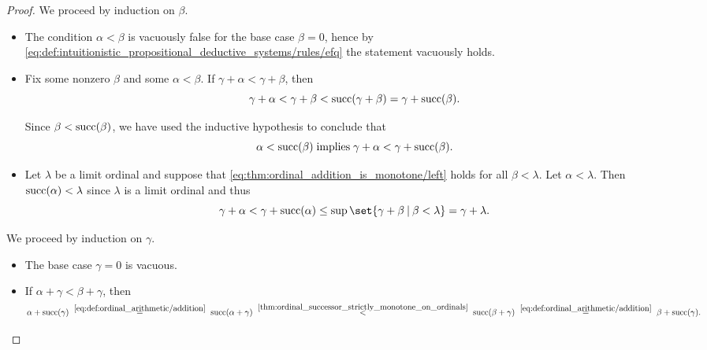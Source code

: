 \begin{proof}
   We proceed by induction on \( \beta \).
  \begin{itemize}
    \item The condition \( \alpha < \beta \) is vacuously false for the base case \( \beta = 0 \), hence by \eqref{eq:def:intuitionistic_propositional_deductive_systems/rules/efq} the statement vacuously holds.

    \item Fix some nonzero \( \beta \) and some \( \alpha < \beta \). If \( \gamma + \alpha < \gamma + \beta \), then
    \begin{equation*}
      \gamma + \alpha < \gamma + \beta < \operatorname{succ}(\gamma + \beta) = \gamma + \operatorname{succ}(\beta).
    \end{equation*}

    Since \( \beta < \operatorname{succ}(\beta) \), we have used the inductive hypothesis to conclude that
    \begin{equation*}
      \alpha < \op{succ}(\beta) \T{implies} \gamma + \alpha < \gamma + \op{succ}(\beta).
    \end{equation*}

    \item Let \( \lambda \) be a limit ordinal and suppose that \eqref{eq:thm:ordinal_addition_is_monotone/left} holds for all \( \beta < \lambda \). Let \( \alpha < \lambda \). Then \( \operatorname{succ}(\alpha) < \lambda \) since \( \lambda \) is a limit ordinal and thus
    \begin{equation*}
      \gamma + \alpha
      <
      \gamma + \op{succ}(\alpha)
      \leq
      \sup\set{ \gamma + \beta \given \beta < \lambda }
      =
      \gamma + \lambda.
    \end{equation*}
  \end{itemize}

   We proceed by induction on \( \gamma \).
  \begin{itemize}
    \item The base case \( \gamma = 0 \) is vacuous.
    \item If \( \alpha + \gamma < \beta + \gamma \), then
    \begin{equation*}
      \alpha + \op{succ}(\gamma)
      \reloset {\eqref{eq:def:ordinal_arithmetic/addition}} =
      \op{succ}(\alpha + \gamma)
      \reloset {\ref{thm:ordinal_successor_strictly_monotone_on_ordinals}} <
      \op{succ}(\beta + \gamma)
      \reloset {\eqref{eq:def:ordinal_arithmetic/addition}} =
      \beta + \op{succ}(\gamma).
    \end{equation*}


\end{itemize}
\end{proof}
